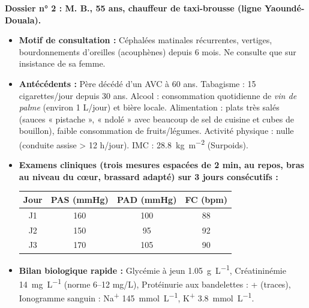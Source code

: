 \documentclass[11pt]{article}
\begin{document}
\vspace{1em}
\noindent\textbf{Dossier n° 2 : M. B., 55 ans, chauffeur de taxi-brousse (ligne Yaoundé-Douala).}
\begin{itemize}
    \item \textbf{Motif de consultation :} Céphalées matinales récurrentes, vertiges, bourdonnements d'oreilles (acouphènes) depuis 6 mois. Ne consulte que sur insistance de sa femme.
    \item \textbf{Antécédents :} Père décédé d'un AVC à 60 ans. Tabagisme : 15 cigarettes/jour depuis 30 ans. Alcool : consommation quotidienne de \textit{vin de palme} (environ 1 L/jour) et bière locale. Alimentation : plats très salés (sauces « pistache », « ndolé » avec beaucoup de sel de cuisine et cubes de bouillon), faible consommation de fruits/légumes. Activité physique : nulle (conduite assise > 12 h/jour). IMC : \SI{28,8}{kg.m^{-2}} (Surpoids).
    \item \textbf{Examens cliniques (trois mesures espacées de 2 min, au repos, bras au niveau du cœur, brassard adapté) sur 3 jours consécutifs :}
    \begin{center}
        \begin{tabular}{|c|c|c|c|}\hline
            Jour & PAS (mmHg) & PAD (mmHg) & FC (bpm) \\ \hline
            J1 & 160 & 100 & 88 \\
            J2 & 150 & 95 & 92 \\
            J3 & 170 & 105 & 90 \\ \hline
        \end{tabular}
    \end{center}
    \item \textbf{Bilan biologique rapide :} Glycémie à jeun \SI{1,05}{g.L^{-1}}, Créatininémie \SI{14}{\mg.L^{-1}} (norme 6--12 mg/L), Protéinurie aux bandelettes : + (traces), Ionogramme sanguin : Na\textsuperscript{+} \SI{145}{mmol.L^{-1}}, K\textsuperscript{+} \SI{3,8}{mmol.L^{-1}}.
\end{itemize}
\end{document}
